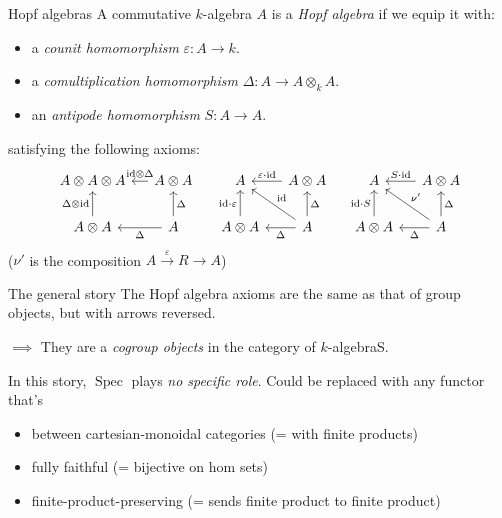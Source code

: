 \documentclass[10pt, handout]{beamer}
\def\id{\mathrm{id}}
\DeclareMathOperator{\Spec}{Spec}
\begin{document}
\begin{frame}{Hopf algebras}
    A commutative $k$-algebra $A$ is a \emph{Hopf algebra} if we equip it with:
    \begin{itemize}
        \item a \emph{counit homomorphism} $\varepsilon: A\to k$.
        \item a \emph{comultiplication homomorphism} $\Delta: A \to A \otimes_k A$.
        \item an \emph{antipode homomorphism} $S: A \to A$.
    \end{itemize}

    \pause

    satisfying the following axioms:
    \[
    \begin{tikzcd}[ampersand replacement=\&, column sep=small]
        A \otimes A \otimes A
        \& A \otimes A \ar[l,"\id \otimes \Delta"']
        \& A
        \& A \otimes A \ar[l, "\varepsilon \cdot\id"']
        \& A
        \& A \otimes A \ar[l,"S \cdot\id"']
        \\
        A \otimes A \ar[u,"\Delta \otimes \id"]
        \& A \ar[u,"\Delta"'] \ar[l,"\Delta"]
        \& A \otimes A \ar[u,"\id \cdot\varepsilon"]
        \& A \ar[u,"\Delta"'] \ar[ul,"\id"'] \ar[l,"\Delta"]
        \& A \otimes A \ar[u,"\id \cdot S"]
        \& A \ar[ul,"\nu'"'] \ar[u,"\Delta"'] \ar[l,"\Delta"]
    \end{tikzcd}
    \]
     ($\nu'$ is the composition $A \xrightarrow{\varepsilon} R \to A$)
\end{frame}


\begin{frame}{The general story}
    The Hopf algebra axioms are the same as that of group objects, but with arrows reversed.

    $\implies$ They are a \emph{cogroup objects} in the category of $k$-algebraS.

    \pause

    In this story, $\Spec$ plays \emph{no specific role}. Could be replaced with any functor that's
    \begin{itemize}
        \item between cartesian-monoidal categories (= with finite products)
        \item fully faithful (= bijective on hom sets)
        \item finite-product-preserving (= sends finite product to finite product)
    \end{itemize}
\end{frame}
\end{document}
